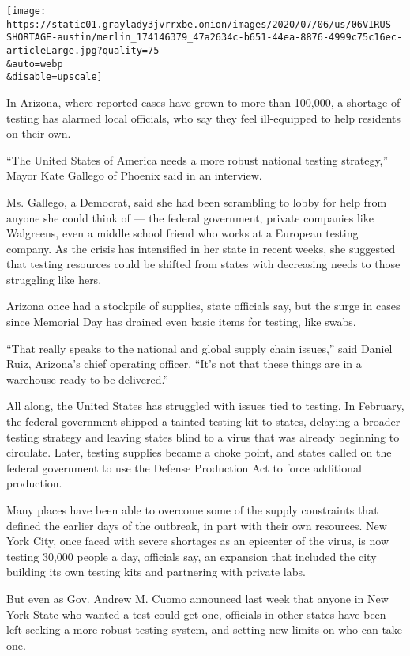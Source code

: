 \texttt{[image: https://static01.graylady3jvrrxbe.onion/images/2020/07/06/us/06VIRUS-SHORTAGE-austin/merlin\_174146379\_47a2634c-b651-44ea-8876-4999c75c16ec-articleLarge.jpg?quality=75\\\&auto=webp\\\&disable=upscale]}

In Arizona, where reported cases have grown to more than 100,000, a
shortage of testing has alarmed local officials, who say they feel
ill-equipped to help residents on their own.

``The United States of America needs a more robust national testing
strategy,'' Mayor Kate Gallego of Phoenix said in an interview.

Ms. Gallego, a Democrat, said she had been scrambling to lobby for help
from anyone she could think of --- the federal government, private
companies like Walgreens, even a middle school friend who works at a
European testing company. As the crisis has intensified in her state in
recent weeks, she suggested that testing resources could be shifted from
states with decreasing needs to those struggling like hers.

Arizona once had a stockpile of supplies, state officials say, but the
surge in cases since Memorial Day has drained even basic items for
testing, like swabs.

``That really speaks to the national and global supply chain issues,''
said Daniel Ruiz, Arizona's chief operating officer. ``It's not that
these things are in a warehouse ready to be delivered.''

All along, the United States has struggled with issues tied to testing.
In February, the federal government shipped a tainted testing kit to
states, delaying a broader testing strategy and leaving states blind to
a virus that was already beginning to circulate. Later, testing supplies
became a choke point, and states called on the federal government to use
the Defense Production Act to force additional production.

Many places have been able to overcome some of the supply constraints
that defined the earlier days of the outbreak, in part with their own
resources. New York City, once faced with severe shortages as an
epicenter of the virus, is now testing 30,000 people a day, officials
say, an expansion that included the city building its own testing kits
and partnering with private labs.

But even as Gov. Andrew M. Cuomo announced last week that anyone in New
York State who wanted a test could get one, officials in other states
have been left seeking a more robust testing system, and setting new
limits on who can take one.

